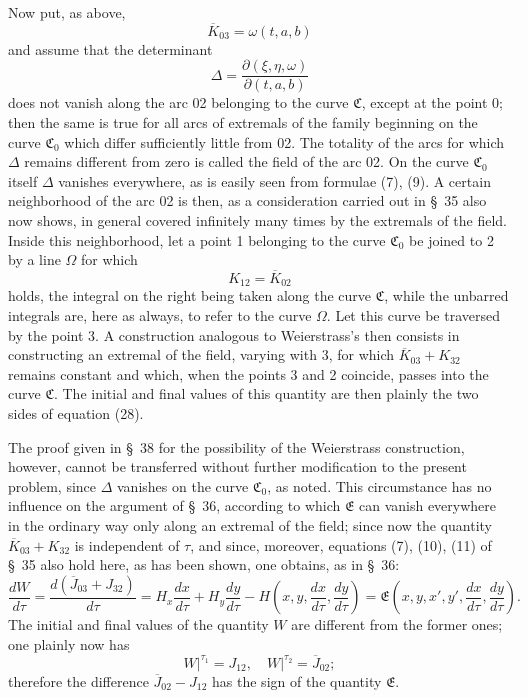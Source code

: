 \documentclass[11pt,a4paper,leqno]{article}
\begin{document}
Now put, as above,
\[
\overline{K}_{03}=\omega(t,a,b)
\]
and assume that the determinant
\[
\Delta=\frac{\partial(\xi,\eta,\omega)}{\partial(t,a,b)}
\]
does not vanish along the arc 02 belonging to the curve $\mathfrak{C}$, except at the point 0; then the same is true for all arcs of extremals of the family beginning on the curve $\mathfrak{C}_0$ which differ sufficiently little from 02. The totality of the arcs for which $\Delta$ remains different from zero is called the field of the arc 02. On the curve $\mathfrak{C}_0$ itself $\Delta$ vanishes everywhere, as is easily seen from formulae (7), (9). A certain neighborhood of the arc 02 is then, as a consideration carried out in \S~35 also now shows, in general covered infinitely many times by the extremals of the field. Inside this neighborhood, let a point 1 belonging to the curve $\mathfrak{C}_0$ be joined to 2 by a line $\Omega$ for which
\begin{equation}\tag{28}
K_{12}=\overline{K}_{02}
\end{equation}
holds, the integral on the right being taken along the curve $\mathfrak{C}$, while the unbarred integrals are, here as always, to refer to the curve $\Omega$. Let this curve be traversed by the point 3. A construction analogous to Weierstrass's then consists in constructing an extremal of the field, varying with 3, for which $\overline{K}_{03}+K_{32}$ remains constant and which, when the points 3 and 2 coincide, passes into the curve $\mathfrak{C}$. The initial and final values of this quantity are then plainly the two sides of equation (28).

The proof given in \S~38 for the possibility of the Weierstrass construction, however, cannot be transferred without further modification to the present problem, since $\Delta$ vanishes on the curve $\mathfrak{C}_0$, as noted. This circumstance has no influence on the argument of \S~36, according to which $\mathfrak{E}$ can vanish everywhere in the ordinary way only along an extremal of the field; since now the quantity $\overline{K}_{03}+K_{32}$ is independent of $\tau$, and since, moreover, equations (7), (10), (11) of \S~35 also hold here, as has been shown, one obtains, as in \S~36:
\[
\frac{dW}{d\tau}=\frac{d(\overline{J}_{03}+J_{32})}{d\tau}
=H_x\frac{dx}{d\tau}+H_y\frac{dy}{d\tau}-H\left(x,y,\frac{dx}{d\tau},\frac{dy}{d\tau}\right)
=\mathfrak{E}\left(x,y,x',y',\frac{dx}{d\tau},\frac{dy}{d\tau}\right).
\]
The initial and final values of the quantity $W$ are different from the former ones; one plainly now has
\[
\left.W\right|^{\tau_1}=J_{12},\quad \left.W\right|^{\tau_2}=\overline{J}_{02};
\]
therefore the difference $\overline{J}_{02}-J_{12}$ has the sign of the quantity $\mathfrak{E}$.
\end{document}
